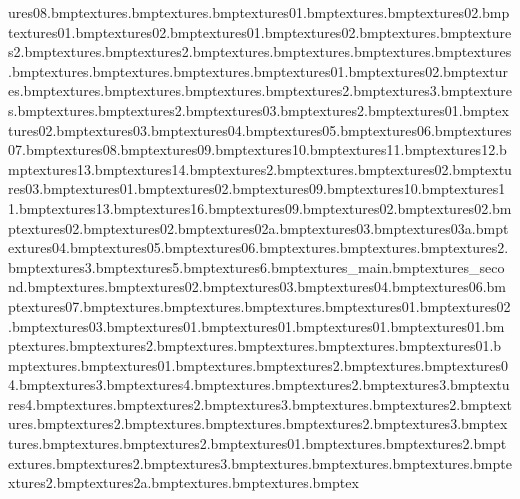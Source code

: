 ures\anvil08.bmp textures\bankwall.bmp textures\bankwallpaper.bmp textures\base01.bmp textures\battery.bmp textures\battery02.bmp textures\batteryside01.bmp textures\batteryside02.bmp textures\bigcraneside01.bmp textures\bigcraneside02.bmp textures\bigpizza.bmp textures\bigpizza2.bmp textures\blueprint.bmp textures\blueprint2.bmp textures\bulbbase.bmp textures\burgbun.bmp textures\burgmeat.bmp textures\burgtom.bmp textures\cake.bmp textures\can.bmp textures\canhole.bmp textures\canmachineshutter01.bmp textures\canmachineshutter02.bmp textures\cbristle.bmp textures\cbsarnie.bmp textures\ceilingtiles.bmp textures\cellfloor.bmp textures\cellfloor2.bmp textures\cellfloor3.bmp textures\cementpit.bmp textures\cementspill.bmp textures\cementspill2.bmp textures\machineback03.bmp textures\chain2.bmp textures\chblock01.bmp textures\chblock02.bmp textures\chblock03.bmp textures\chblock04.bmp textures\chblock05.bmp textures\chblock06.bmp textures\chblock07.bmp textures\chblock08.bmp textures\chblock09.bmp textures\chblock10.bmp textures\chblock11.bmp textures\chblock12.bmp textures\chblock13.bmp textures\chblock14.bmp textures\chess2.bmp textures\chicken.bmp textures\chicken02.bmp textures\chicken03.bmp textures\chubcons01.bmp textures\chubcons02.bmp textures\chubcons09.bmp textures\chubcons10.bmp textures\chubcons11.bmp textures\chubcons13.bmp textures\chubcons16.bmp textures\chubice09.bmp textures\citybloom02.bmp textures\citycheesewire02.bmp textures\cityiron02.bmp textures\citypave02.bmp textures\citypave02a.bmp textures\citypave03.bmp textures\citypave03a.bmp textures\citypave04.bmp textures\citypave05.bmp textures\citypave06.bmp textures\cityroad.bmp textures\citytarmac.bmp textures\citytarmac2.bmp textures\citytarmac3.bmp textures\citytarmac5.bmp textures\citytarmac6.bmp textures\city_main.bmp textures\city_second.bmp textures\clubsandwich.bmp textures\clubsandwich02.bmp textures\clubsandwich03.bmp textures\clubsandwich04.bmp textures\clubsandwich06.bmp textures\clubsandwich07.bmp textures\concretefloor.bmp textures\concretewall.bmp textures\craneblock.bmp textures\crispbutton01.bmp textures\crispbutton02.bmp textures\crispbutton03.bmp textures\crispfront01.bmp textures\crisps01.bmp textures\crispside01.bmp textures\crisptop01.bmp textures\cwcup.bmp textures\cwhat2.bmp textures\cwsarnie.bmp textures\dollersign.bmp textures\doorgroove.bmp textures\doughnutchocolate01.bmp textures\doughnutinside.bmp textures\doughnutjam01.bmp textures\doughnutsprinkles.bmp textures\doughnutsprinkles2.bmp textures\fence.bmp textures\machineback04.bmp textures\fence3.bmp textures\fence4.bmp textures\fenceboards.bmp textures\fenceboards2.bmp textures\fenceboards3.bmp textures\fenceboards4.bmp textures\fencesteel.bmp textures\fencesteel2.bmp textures\fencesteel3.bmp textures\fencewood.bmp textures\fencewood2.bmp textures\flask.bmp textures\flask2.bmp textures\footsteps.bmp textures\fries.bmp textures\fries2.bmp textures\fries3.bmp textures\girderwire.bmp textures\glass.bmp textures\glass2.bmp textures\glassstripe01.bmp textures\greyconcrack.bmp textures\greyconcrack2.bmp textures\greyconcrete.bmp textures\greyconcrete2.bmp textures\greyconcrete3.bmp textures\greyconmorta.bmp textures\ground.bmp textures\gurder.bmp textures\gurder2.bmp textures\gurder2a.bmp textures\gurdera.bmp textures\gurderend.bmp tex